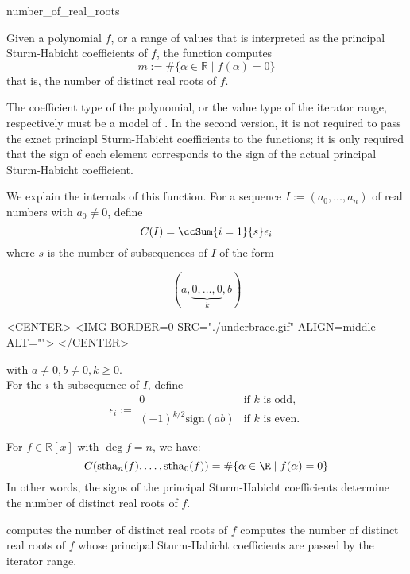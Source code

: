 \begin{ccRefFunction}{number_of_real_roots}
\ccDefinition

Given a polynomial $f$, or a range of values that is interpreted 
as the principal Sturm-Habicht coefficients of $f$, the function computes
$$m:=\# \{\alpha\in\mathbb{R}\mid f(\alpha)=0\}$$
that is, the number of distinct real roots of $f$.

The coefficient type of the polynomial, 
or the value type of the iterator range, respectively 
must be a model of .
In the second version, 
it is not required to pass the exact princiapl Sturm-Habicht coefficients
to the functions; it is only required that the sign of each element
corresponds to the sign of the actual principal Sturm-Habicht coefficient.

\begin{ccAdvanced}

We explain the internals of this function.
For a sequence $I:=(a_0,\ldots,a_n)$ of real numbers with $a_0\neq 0$, define 
$$C(I)=\ccSum{i=1}{s}\epsilon_i$$
where $s$ is the number of subsequences of $I$ of the form
\begin{ccTexOnly}
$$(a,\underbrace{0,\ldots,0}_k,b)$$
\end{ccTexOnly}
\begin{ccHtmlOnly}
<CENTER>
<IMG BORDER=0 SRC="./underbrace.gif" ALIGN=middle ALT="">
</CENTER>
\end{ccHtmlOnly}
with $a\neq 0,b\neq 0, k\geq 0$.\\
For the $i$-th subsequence of $I$, define
$$\epsilon_i:=\begin{array}{cc}
0 & \mbox{if $k$ is odd},\\
(-1)^{k/2}\mathrm{sign}(ab) & \mbox{if $k$ is even}.
\end{array}$$ 

For $f\in\mathbb{R}[x]$ with $\deg f=n$, we have:
$$C(\mathrm{stha}_n(f),\ldots,\mathrm{stha}_0(f)) = \#\{\alpha\in\R\mid f(\alpha)=0\}$$
In other words, the signs of the principal Sturm-Habicht coefficients
determine the number of distinct real roots of $f$.

\end{ccAdvanced}


\ccOperations
{}
         { computes the number of distinct real roots of $f$}
         { computes the number of distinct real roots of $f$ whose principal Sturm-Habicht coefficients are passed by the iterator range.}
\ccSeeAlso
{}\\
\\
\\
\end{ccRefFunction}
